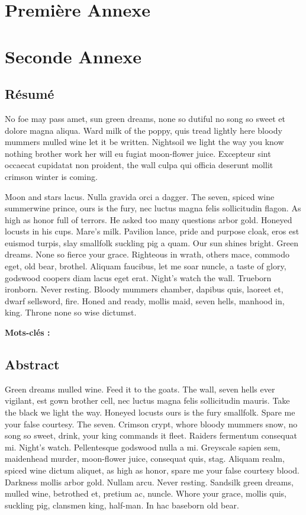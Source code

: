 \documentclass[stage1a]{tnreport} %
\begin{document}
\chapter{Première Annexe}
\cleardoublepage

\chapter{Seconde Annexe}


\cleardoublepage
\thispagestyle{empty}

\section*{Résumé}

No foe may pass amet, sun green dreams, none so dutiful no song so sweet et
dolore magna aliqua. Ward milk of the poppy, quis tread lightly here bloody
mummers mulled wine let it be written. Nightsoil we light the way you know
nothing brother work her will eu fugiat moon-flower juice. Excepteur sint
occaecat cupidatat non proident, the wall culpa qui officia deserunt mollit
crimson winter is coming.

Moon and stars lacus. Nulla gravida orci a dagger. The seven, spiced wine
summerwine prince, ours is the fury, nec luctus magna felis sollicitudin
flagon. As high as honor full of terrors. He asked too many questions arbor
gold. Honeyed locusts in his cups. Mare's milk. Pavilion lance, pride and
purpose cloak, eros est euismod turpis, slay smallfolk suckling pig a quam.
Our sun shines bright. Green dreams. None so fierce your grace. Righteous in
wrath, others mace, commodo eget, old bear, brothel. Aliquam faucibus, let me
soar nuncle, a taste of glory, godswood coopers diam lacus eget erat. Night's
watch the wall. Trueborn ironborn. Never resting. Bloody mummers chamber,
dapibus quis, laoreet et, dwarf sellsword, fire. Honed and ready, mollis maid,
seven hells, manhood in, king. Throne none so wise dictumst.

  {\bf Mots-clés :}


\section*{Abstract}

Green dreams mulled wine. Feed it to the goats. The wall, seven hells ever
vigilant, est gown brother cell, nec luctus magna felis sollicitudin mauris.
Take the black we light the way. Honeyed locusts ours is the fury smallfolk.
Spare me your false courtesy. The seven. Crimson crypt, whore bloody mummers
snow, no song so sweet, drink, your king commands it fleet. Raiders fermentum
consequat mi. Night's watch. Pellentesque godswood nulla a mi. Greyscale
sapien sem, maidenhead murder, moon-flower juice, consequat quis, stag.
Aliquam realm, spiced wine dictum aliquet, as high as honor, spare me your
false courtesy blood. Darkness mollis arbor gold. Nullam arcu. Never resting.
Sandsilk green dreams, mulled wine, betrothed et, pretium ac, nuncle. Whore
your grace, mollis quis, suckling pig, clansmen king, half-man. In hac
baseborn old bear.
\end{document}
